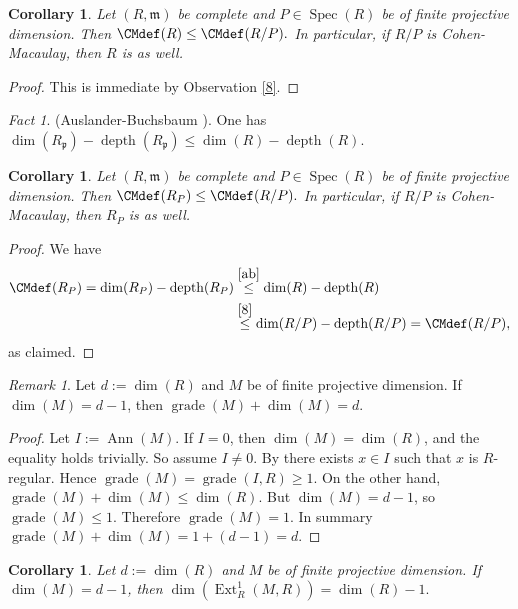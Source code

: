 \documentclass[11.05pt,a4paper]{amsart}
\newtheorem{corollary}[theorem]{Corollary}
\theoremstyle{definition}
\theoremstyle{remark}
\newtheorem{remark}[theorem]{Remark}\newtheorem{fact}[theorem]{Fact}
\newcommand{\grade}{\operatorname{grade}}
\newcommand{\Spec}{\operatorname{Spec}}
\newcommand{\Ext}{\operatorname{Ext}}
\newcommand{\Ann}{\operatorname{Ann}}
\newcommand{\depth}{\operatorname{depth}}
\begin{document}
\begin{corollary}\label{8c}
	Let $(R,\mathfrak{m})$ be complete   and $P\in\Spec(R)$ be of finite projective dimension. Then  
	\(
\CMdef(R)\leq \CMdef( R/P).
	\)
	In particular, if $R/P$ is Cohen-Macaulay, then $R$ is as well.
\end{corollary}

\begin{proof}
This is immediate by Observation \ref {8}.
\end{proof}

\begin{fact}\label{ab}(Auslander-Buchsbaum \cite[Page 649]{ABU1}). One has
$\dim (R_{\mathfrak{p}}) - \depth(R_{\mathfrak{p}}) \leq \dim (R) - \depth(R)$.
\end{fact}


\begin{corollary}\label{70}
	Let $(R,\mathfrak{m})$ be complete   and $P\in\Spec(R)$ be of finite projective dimension. Then  
	\(
	\CMdef(R_P)\leq \CMdef( R/P).
	\)
	In particular, if $R/P$ is Cohen-Macaulay, then $R_P$ is as well.
\end{corollary}




\begin{proof}
	We have
	\begin{align*}
\CMdef(R_P)
= \dim(R_P) - \depth(R_P) 
	&\stackrel{\ref{ab}}\leq \dim(R  ) - \depth(R)\\
	&\stackrel{\ref{8}}\leq\dim(R/P) - \depth(R/P)  =\CMdef(R/P),
	\end{align*}as claimed.
\end{proof}





 
 \begin{remark}\label{54}Let $d := \dim (R)$ and $M$ be of finite projective dimension. If $\dim (M) = d-1$, then  
\(
\grade(M) + \dim (M )= d.
\)
\end{remark}
\begin{proof}
	Let $I := \Ann(M)$. If $I = 0$, then $\dim (M) = \dim (R)$, and the equality holds trivially. So assume $I \neq 0$. By   \cite[Lemma 2.28]{wol}  there exists $x \in I$ such that $x$ is $R$-regular. Hence
	\(
	\grade(M) = \grade(I, R) \geq 1.
	\)
	On the other hand,
	\(
	\grade(M) + \dim (M) \leq \dim (R).
	\)
	But $\dim( M) = d-1$, so $\grade(M) \leq 1$. Therefore $\grade(M) = 1$. In summary
	\(
	\grade(M) + \dim (M )= 1 + (d-1) = d.
	\)
\end{proof}
\begin{corollary}
	Let $d := \dim( R)$ and $M$ be of finite projective dimension. If $\dim (M )= d-1$, then  	\(
	\dim (\Ext^{1}_R(M, R)) = \dim (R) - 1.
	\)
\end{corollary}
\end{document}
